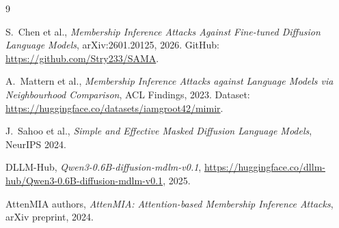 \documentclass[11pt,a4paper]{article}
\begin{document}

\begin{thebibliography}{9}

S.~Chen et al.,
\textit{Membership Inference Attacks Against Fine-tuned Diffusion Language Models},
arXiv:2601.20125, 2026.
GitHub: \url{https://github.com/Stry233/SAMA}.

A.~Mattern et al.,
\textit{Membership Inference Attacks against Language Models via Neighbourhood Comparison},
ACL Findings, 2023.
Dataset: \url{https://huggingface.co/datasets/iamgroot42/mimir}.

J.~Sahoo et al.,
\textit{Simple and Effective Masked Diffusion Language Models},
NeurIPS 2024.

DLLM-Hub,
\textit{Qwen3-0.6B-diffusion-mdlm-v0.1},
\url{https://huggingface.co/dllm-hub/Qwen3-0.6B-diffusion-mdlm-v0.1}, 2025.

AttenMIA authors,
\textit{AttenMIA: Attention-based Membership Inference Attacks},
arXiv preprint, 2024.

\end{thebibliography}
\end{document}
